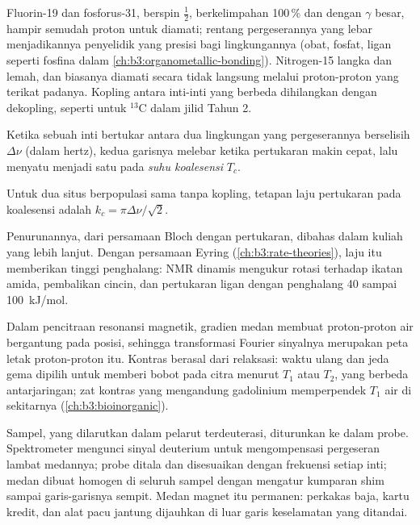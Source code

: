 Fluorin-19 dan fosforus-31, berspin $\frac12$, berkelimpahan 100\,\% dan dengan
$\gamma$ besar, hampir semudah proton untuk diamati; rentang pergeserannya yang
lebar menjadikannya penyelidik yang presisi bagi lingkungannya (obat, fosfat,
ligan seperti fosfina dalam \cref{ch:b3:organometallic-bonding}).
Nitrogen-15 langka dan lemah, dan biasanya diamati secara tidak langsung
melalui proton-proton yang terikat padanya. Kopling antara inti-inti yang
berbeda dihilangkan dengan dekopling, seperti untuk ${}^{13}$C dalam jilid
Tahun 2.

\begin{definition}\label{def:b3:advanced-nmr:coalescence}
Ketika sebuah inti bertukar antara dua lingkungan yang pergeserannya berselisih
$\Delta\nu$ (dalam hertz), kedua garisnya melebar ketika pertukaran makin
cepat, lalu menyatu menjadi satu pada \emph{suhu
koalesensi} $T_c$.
\end{definition}

\begin{proposition}\label{prop:b3:advanced-nmr:coalescence}
Untuk dua situs berpopulasi sama tanpa kopling, tetapan laju pertukaran pada
koalesensi adalah $k_c = \pi\Delta\nu/\sqrt2$.
\end{proposition}
\admitted

Penurunannya, dari persamaan Bloch dengan pertukaran, dibahas dalam kuliah
yang lebih lanjut. Dengan persamaan Eyring (\cref{ch:b3:rate-theories}), laju
itu memberikan tinggi penghalang: NMR dinamis mengukur rotasi terhadap
ikatan amida, pembalikan cincin, dan pertukaran ligan dengan penghalang 40
sampai \qty{100}{kJ/mol}.

\begin{example}\label{ex:b3:advanced-nmr:mri}
Dalam pencitraan resonansi magnetik, gradien medan membuat 
proton-proton air bergantung pada posisi, sehingga transformasi Fourier
sinyalnya merupakan peta letak proton-proton itu. Kontras berasal dari
relaksasi: waktu ulang dan jeda gema dipilih untuk memberi bobot pada citra
menurut $T_1$ atau $T_2$, yang berbeda antarjaringan; zat kontras yang
mengandung gadolinium memperpendek $T_1$ air di sekitarnya
(\cref{ch:b3:bioinorganic}).
\end{example}

\begin{inthelab}
Sampel, yang dilarutkan dalam pelarut terdeuterasi, diturunkan ke dalam
probe. Spektrometer mengunci sinyal deuterium untuk mengompensasi pergeseran
lambat medannya; probe ditala dan disesuaikan dengan frekuensi setiap inti;
medan dibuat homogen di seluruh sampel dengan mengatur kumparan shim sampai
garis-garisnya sempit. Medan magnet itu permanen: perkakas baja, kartu kredit,
dan alat pacu jantung dijauhkan di luar garis keselamatan yang ditandai.
\end{inthelab}

